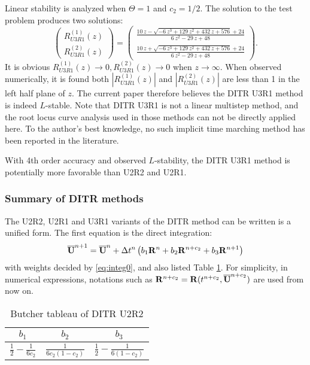 Linear stability is analyzed when $\Theta =1$ and $c_2 = 1/2$.
The solution to the test problem
produces two solutions:
\begin{equation}
    \left(
    \begin{matrix}
        R_{U3R1}^{(1)}(z) \\
        R_{U3R1}^{(2)}(z)
    \end{matrix}
    \right)=\left(\begin{array}{c} \frac{10\,z-\sqrt{-6\,z^3+129\,z^2+432\,z+576}+24}{6\,z^2-29\,z+48}\\ \frac{10\,z+\sqrt{-6\,z^3+129\,z^2+432\,z+576}+24}{6\,z^2-29\,z+48} \end{array}\right)
    .
\end{equation}
It is obvious $R_{U3R1}^{(1)}(z)\rightarrow 0, R_{U3R1}^{(2)}(z)\rightarrow0$ when
$z\rightarrow\infty$.
When observed numerically, it is found both $|R_{U3R1}^{(1)}(z)|$
and $|R_{U3R1}^{(2)}(z)|$ are less than 1 in the left
half plane of $z$.
The current paper therefore believes %
the DITR U3R1 method is indeed $L$-stable.
Note that DITR U3R1 is not a linear multistep method,
and the root locus curve analysis used in those methods
can not be directly applied here.
To the author's best knowledge, no
such implicit time marching method
has been reported in the literature.

With 4th order accuracy and observed $L$-stability, the
DITR U3R1 method is potentially more favorable than
U2R2 and U2R1.

\subsubsection{Summary of DITR methods}
\label{sssec:sumDITRs}

The U2R2, U2R1 and U3R1 variants of the
DITR method can be written is a unified form.
The first equation is the direct integration:
\begin{equation}
    \overline{\mathbf{U}}^{n+1} = \overline{\mathbf{U}}^{n} + {\Delta} t^n\left(
    b_1 \mathbf{R}^n +
    b_2 \mathbf{R}^{n+c_2} +
    b_3 \mathbf{R}^{n+1}
    \right)
    \label{eq:DISum}
\end{equation}
with weights decided by \eqref{eq:integ0},
and also listed Table \ref{tab:integ0Tab}.
For simplicity, in numerical expressions,
notations such as $\mathbf{R}^{n+c_2}=\mathbf{R}(t^{n+c_2}, \overline{\mathbf{U}}^{n+c_2})$
are used from now on.
\begin{table}[htbp]
    \centering
    \begin{tabular}{|c|c|c|}
        \hline
        $b_1$                            & $b_2$ & $b_3$ \\
        \hline
        $\frac{1}{2} - \frac{1}{6{c_2}}$ &
        $\frac{1}{6{c_2}(1-{c_2})}$      &
        $\frac{1}{2} - \frac{1}{6(1-{c_2})} $            \\
        \hline
    \end{tabular}
    \caption{Butcher tableau of DITR U2R2}
    \label{tab:integ0Tab}
\end{table}

